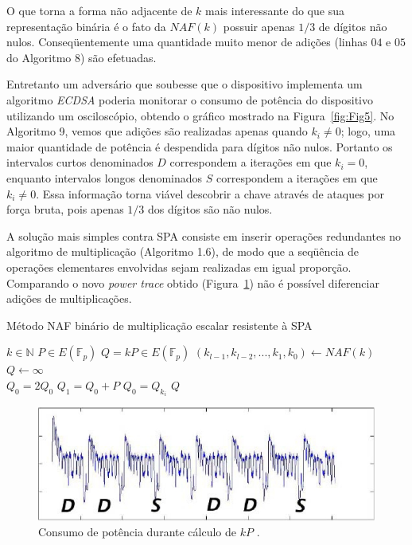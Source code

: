 O que torna a forma n\~{a}o adjacente de $k$ mais interessante do que sua representa\c{c}\~{a}o bin\'{a}ria \'{e} o fato da $NAF(k)$ possuir apenas $1/3$ de d\'{i}gitos n\~{a}o nulos. Conseq\"{u}entemente uma quantidade muito menor de adi\c{c}\~{o}es (linhas $04$ e $05$ do Algoritmo 8) s\~{a}o efetuadas.

Entretanto um advers\'{a}rio que soubesse que o dispositivo implementa um algoritmo \textit{ECDSA} poderia monitorar o consumo de pot\^{e}ncia do dispositivo utilizando um oscilosc\'{o}pio, obtendo o gr\'{a}fico mostrado na Figura~\ref{fig:Fig5}. No Algoritmo 9, vemos que adi\c{c}\~{o}es s\~{a}o realizadas apenas quando $k_{i} \neq 0$; logo, uma maior quantidade de pot\^{e}ncia \'{e} despendida para d\'{i}gitos n\~{a}o nulos. Portanto os intervalos curtos denominados $D$ correspondem a itera\c{c}\~{o}es em que $k_{i} = 0$, enquanto intervalos longos denominados $S$ correspondem a itera\c{c}\~{o}es em que $k_{i} \neq 0$. Essa informa\c{c}\~{a}o torna vi\'{a}vel descobrir a chave atrav\'{e}s de ataques por for\c{c}a bruta, pois apenas $1/3$ dos d\'{i}gitos s\~{a}o n\~{a}o nulos.

A solu\c{c}\~{a}o mais simples contra SPA consiste em inserir opera\c{c}\~{o}es redundantes no algoritmo de multiplica\c{c}\~{a}o (Algoritmo 1.6), de modo que a seq\"{u}\^{e}ncia de opera\c{c}\~{o}es elementares envolvidas sejam realizadas em igual propor\c{c}\~{a}o. Comparando o novo \textit{power trace} obtido (Figura~\ref{fig:Fig7}) n\~{a}o \'{e} poss\'{i}vel diferenciar adi\c{c}\~{o}es de multiplica\c{c}\~{o}es.

\begin{algorithm}[H]
\caption{M\'{e}todo NAF bin\'{a}rio de multiplica\c{c}\~{a}o escalar resistente \`{a} SPA}
\begin{algorithmic}
    \REQUIRE $k \in \mathbb{N}$
    \REQUIRE $P \in E(\mathbb{F}_p)$
    \ENSURE $Q = kP \in E(\mathbb{F}_p)$
    \STATE $(k_{l-1}, k_{l-2}, ..., k_{1}, k_{0}) \leftarrow NAF(k)$
    \STATE $Q \leftarrow \infty$\\
        \STATE $Q_{0} = 2Q_{0}$
        \STATE $Q_{1} = Q_{0} + P$
        \STATE $Q_{0} = Q_{k_{i}}$
    \ENDFOR
    \RETURN $Q$
    \end{algorithmic}
\end{algorithm}

\begin{figure}[ht]
	\centering
	\includegraphics[width=.8\textwidth]{figures/spa2.jpg}
	\caption{Consumo de pot\^{e}ncia durante c\'{a}lculo de $kP$ \cite{ECCBook_HankersonVanstone2004}.}
	\label{fig:Fig7}
\end{figure}

